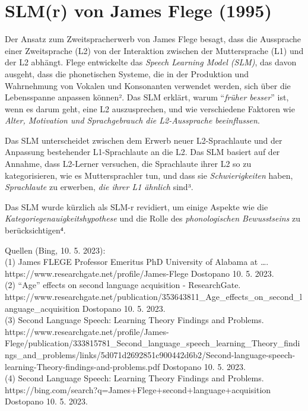 \documentclass[
  letterpaper,
]{scrbook}
\begin{document}
\hypertarget{slmr-von-james-flege-1995}{%
\section{SLM(r) von James Flege
(1995)}\label{slmr-von-james-flege-1995}}

Der Ansatz zum Zweitspracherwerb von James Flege besagt, dass die
Aussprache einer Zweitsprache (L2) von der Interaktion zwischen der
Muttersprache (L1) und der L2 abhängt. Flege entwickelte das
\emph{Speech Learning Model (SLM)}, das davon ausgeht, dass die
phonetischen Systeme, die in der Produktion und Wahrnehmung von Vokalen
und Konsonanten verwendet werden, sich über die Lebensspanne anpassen
können². Das SLM erklärt, warum ``\emph{früher besser}'' ist, wenn es
darum geht, eine L2 auszusprechen, und wie verschiedene Faktoren wie
\emph{Alter, Motivation und Sprachgebrauch die L2-Aussprache
beeinflussen}.

Das SLM unterscheidet zwischen dem Erwerb neuer L2-Sprachlaute und der
Anpassung bestehender L1-Sprachlaute an die L2. Das SLM basiert auf der
Annahme, dass L2-Lerner versuchen, die Sprachlaute ihrer L2 so zu
kategorisieren, wie es Muttersprachler tun, und dass sie
\emph{Schwierigkeiten} haben, \emph{Sprachlaute} zu erwerben, \emph{die
ihrer L1 ähnlich} sind³.

Das SLM wurde kürzlich als SLM-r revidiert, um einige Aspekte wie die
\emph{Kategoriegenauigkeitshypothese} und die Rolle des
\emph{phonologischen Bewusstseins} zu berücksichtigen⁴.

Quellen (Bing, 10. 5. 2023):\\
(1) James FLEGE \textbar{} Professor Emeritus \textbar{} PhD \textbar{}
University of Alabama at \ldots.
https://www.researchgate.net/profile/James-Flege Dostopano 10. 5.
2023.\\
(2) ``Age'' effects on second language acquisition - ResearchGate.
https://www.researchgate.net/publication/353643811\_Age\_effects\_on\_second\_language\_acquisition
Dostopano 10. 5. 2023.\\
(3) Second Language Speech: Learning Theory Findings and Problems.
https://www.researchgate.net/profile/James-Flege/publication/333815781\_Second\_language\_speech\_learning\_Theory\_findings\_and\_problems/links/5d071d2692851c900442d6b2/Second-language-speech-learning-Theory-findings-and-problems.pdf
Dostopano 10. 5. 2023.\\
(4) Second Language Speech: Learning Theory Findings and Problems.
https://bing.com/search?q=James+Flege+second+language+acquisition
Dostopano 10. 5. 2023.
\end{document}
